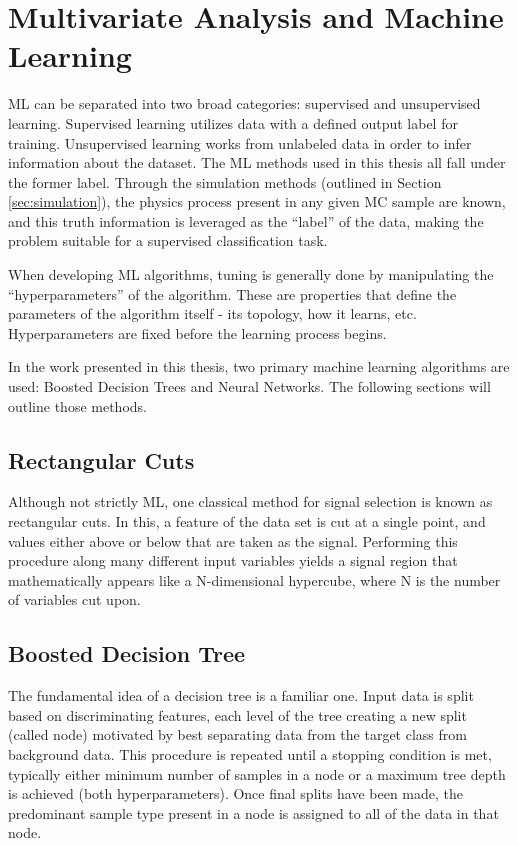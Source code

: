 
\chapter{Multivariate Analysis and Machine Learning}

\gls{ML} can be separated into two broad categories: supervised and unsupervised learning. Supervised learning utilizes data with a defined output label for training. Unsupervised learning works from unlabeled data in order to infer information about the dataset. The \gls{ML} methods used in this thesis all fall under the former label. Through the simulation methods (outlined in Section \ref{sec:simulation}), the physics process present in any given \gls{MC} sample are known, and this truth information is leveraged as the ``label'' of the data, making the problem suitable for a supervised classification task.

When developing \gls{ML} algorithms, tuning is generally done by manipulating the ``hyperparameters'' of the algorithm. These are properties that define the parameters of the algorithm itself - its topology, how it learns, etc. Hyperparameters are fixed before the learning process begins.


In the work presented in this thesis, two primary machine learning algorithms are used: Boosted Decision Trees and Neural Networks. The following sections will outline those methods.

\section{Rectangular Cuts}

Although not strictly \gls{ML}, one classical method for signal selection is known as rectangular cuts. In this, a feature of the data set is cut at a single point, and values either above or below that are taken as the signal. Performing this procedure along many different input variables yields a signal region that mathematically appears like a N-dimensional hypercube, where N is the number of variables cut upon.

\section{Boosted Decision Tree}

The fundamental idea of a decision tree is a familiar one. Input data is split based on discriminating features, each level of the tree creating a new split (called node) motivated by best separating data from the target class from background data. This procedure is repeated until a stopping condition is met, typically either minimum number of samples in a node or a maximum tree depth is achieved (both hyperparameters). Once final splits have been made, the predominant sample type present in a node is assigned to all of the data in that node.

